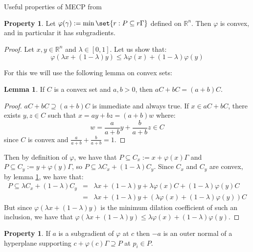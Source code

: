 \documentclass{article}
\theoremstyle{definition}
\newtheorem{lem}[theo]{Lemma}
\newtheorem{prop}[theo]{Property}
\theoremstyle{remark}
\begin{document}
\begin{subsection}{Useful properties of MECP from \cite{BK13,BR09}}
  \begin{prop}
    Let $\varphi(\gamma) := \min\set{r:P \subseteq r\Gamma}$ defined on $\mathbb{R}^n$. Then $\varphi$ is convex, and in particular it has subgradients.
  \end{prop}

  \begin{proof}
    Let $x,y \in \mathbb{R}^n$ and $\lambda \in [0,1]$. Let us show that:
    \[\varphi(\lambda x + (1-\lambda)y) \leq \lambda \varphi(x) + (1-\lambda)\varphi(y)\]

    For this we will use the following lemma on convex sets:
    \begin{lem}
        If $C$ is a convex set and $a,b>0$, then $aC+bC=(a+b)C$.
      \label{lemConvSet}
    \end{lem}

    \begin{proof}
      $aC+bC\supseteq(a+b)C$ is immediate and always true. If $x \in aC+bC$, there exists $y,z \in C$ such that $x = ay+bz=(a+b)w$ where:
      \[w =  \frac{a}{a+b}y+\frac{b}{a+b}z \in C\]
      since $C$ is convex and $\frac{a}{a+b}+\frac{b}{a+b}=1$.
    \end{proof}

    Then by definition of $\varphi$, we have that $P \subseteq C_x := x + \varphi(x)\Gamma$ and $P \subseteq C_y := y + \varphi(y)\Gamma$, so $P \subseteq \lambda C_x + (1-\lambda) C_y$. Since $C_x$ and $C_y$ are convex, by lemma \ref{lemConvSet}, we have that:
    \begin{equation}
      \begin{aligned}
        P \subseteq \lambda C_x + (1-\lambda) C_y &=& \lambda x + (1-\lambda)y +  \lambda\varphi(x)C + (1-\lambda)\varphi(y)C \\
        &=& \lambda x + (1-\lambda)y +  (\lambda\varphi(x) + (1-\lambda)\varphi(y))C
      \end{aligned}
    \end{equation}
    But since $\varphi(\lambda x + (1-\lambda)y)$ is the minimum dilation coefficient of such an inclusion, we have that $\varphi(\lambda x + (1-\lambda)y) \leq \lambda \varphi(x) + (1-\lambda)\varphi(y)$.
  \end{proof}

  \begin{prop}
    If $a$ is a subgradient of $\varphi$ at $c$ then $-a$ is an outer normal of a hyperplane supporting $c + \varphi(c)\Gamma \supseteq P$ at $p_i \in P$.
  \end{prop}


\end{subsection}
\end{document}
